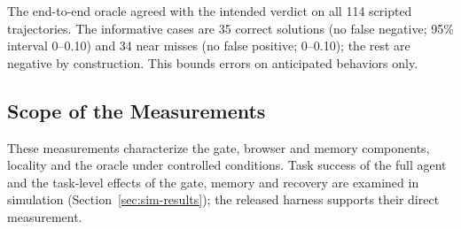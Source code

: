 The end-to-end oracle agreed with the intended verdict on all 114 scripted trajectories. The informative cases are 35 correct solutions (no false negative; 95\% interval 0--0.10) and 34 near misses (no false positive; 0--0.10); the rest are negative by construction. This bounds errors on anticipated behaviors only.

\subsection{Scope of the Measurements}
\label{sec:res-e2e}

These measurements characterize the gate, browser and memory components, locality and the oracle under controlled conditions. Task success of the full agent and the task-level effects of the gate, memory and recovery are examined in simulation (Section~\ref{sec:sim-results}); the released harness supports their direct measurement.
